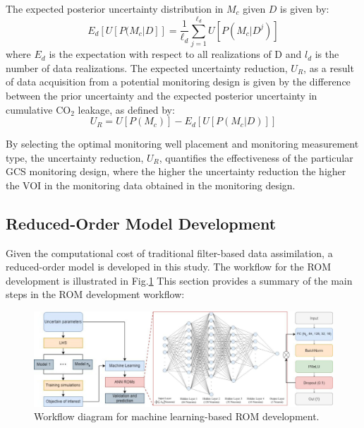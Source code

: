 \documentclass[a4paper,fleqn]{cas-sc}
\begin{document}
The expected posterior uncertainty distribution in $M_c$ given $D$ is given by:
\begin{equation} \label{eq:2}
    E_d [U [ P(M_c \vert D]] = \frac{1}{\ell_d} \sum_{j=1}^{\ell_d} U [P (M_c \vert D^j) ]
\end{equation}
where $E_d$ is the expectation with respect to all realizations of D and $l_d$ is the number of data realizations. The expected uncertainty reduction, $U_R$, as a result of data acquisition from a potential monitoring design is given by the difference between the prior uncertainty and the expected posterior uncertainty in cumulative CO$_2$ leakage, as defined by:
\begin{equation} \label{eq:3}
    U_R = U[P(M_c)] - E_d [U [ P(M_c \vert D)]]
\end{equation}

By selecting the optimal monitoring well placement and monitoring measurement type, the uncertainty reduction, $U_R$, quantifies the effectiveness of the particular GCS monitoring design, where the higher the uncertainty reduction the higher the VOI in the monitoring data obtained in the monitoring design.

\subsection{Reduced-Order Model Development}
Given the computational cost of traditional filter-based data assimilation, a reduced-order model is developed in this study. The workflow for the ROM development is illustrated in Fig.\ref{mlrom} This section provides a summary of the main steps in the ROM development workflow:

\begin{figure}
    \centering
    \includegraphics[width=16cm]{figs/Figure 1.pdf}
    \caption{Workflow diagram for machine learning-based ROM development.}
    \label{mlrom}
\end{figure}
\end{document}
